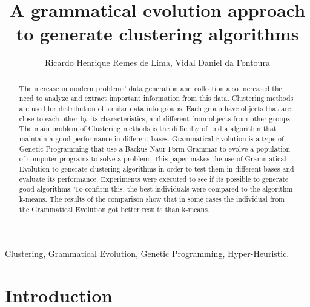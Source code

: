 \documentclass[journal]{IEEEtran}
\begin{document}
%

\title{A grammatical evolution approach to generate clustering algorithms}


\author{
	Ricardo Henrique Remes de Lima,
	Vidal Daniel da Fontoura}


\maketitle

\begin{abstract}

The increase in modern problems' data generation and collection also increased the need to analyze and extract important information from this data. Clustering methods are used for distribution of similar data into groups. Each group have objects that are close to each other by its characteristics, and different from objects from other groups. The main problem of Clustering methods is the difficulty of find a algorithm that maintain a good performance in different bases. Grammatical Evolution is a type of Genetic Programming that use a Backus-Naur Form Grammar to evolve a population of computer programs to solve a problem. This paper makes the use of Grammatical Evolution to generate clustering algorithms in order to test them in different bases and evaluate its performance. Experiments were executed to see if its possible to generate good algorithms. To confirm this, the best individuals were compared to the algorithm k-means. The results of the comparison show that in some cases the individual from the Grammatical Evolution got better results than k-means.

\end{abstract}

\begin{IEEEkeywords}
	Clustering, Grammatical Evolution, Genetic Programming, Hyper-Heuristic.
\end{IEEEkeywords}

\IEEEpeerreviewmaketitle

\section{Introduction}
\end{document}
